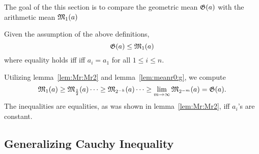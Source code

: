 The goal of the this section is to compare the
geometric mean \(\mathfrak{G}(a)\) with the arithmetic mean \(\mathfrak{M}_1(a)\)
\begin{thm} \label{thm:geo:arith}
Given the assumption of the above definitions,
\begin{equation*}
\mathfrak{G}(a) \leq \mathfrak{M}_1(a)
\end{equation*}
where equality holds iff
iff \(a_i=a_1\) for all \(1\leq i \leq n\).
\end{thm}
\begin{thmproof}
Utilizing lemma~\ref{lem:Mr:Mr2} and lemma~\ref{lem:meanr0:g},
we compute
\begin{equation*}
 \mathfrak{M}_1(a) \geq \mathfrak{M}_{\frac{1}{2}}(a)
 \cdots     \geq \mathfrak{M}_{2^{-k}}(a)
 \cdots     \geq \lim_{m\to\infty} \mathfrak{M}_{2^{-m}}(a) = \mathfrak{G}(a).
\end{equation*}
The inequalities are equalities, as was shown in lemma~\ref{lem:Mr:Mr2},
iff \(a_i\)'s are constant.
\end{thmproof}



\subsection{Generalizing Cauchy Inequality}

